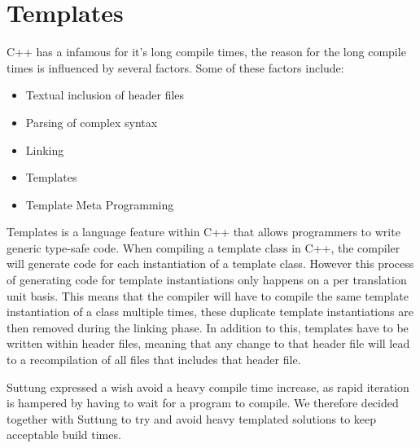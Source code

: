 \section{Templates}
\label{sec:requirements_templates}
C++ has a infamous for it's long compile times, the reason for the long compile times is influenced by several factors.
\cite{stack_overflow_why_does_cpp_compilation_take_so_long}
Some of these factors include:
\begin{itemize}
    \item
    Textual inclusion of header files

    \item
    Parsing of complex syntax

    \item
    Linking

    \item
    Templates

    \item
    Template Meta Programming
\end{itemize}

Templates is a language feature within C++ that allows programmers to write generic type-safe code.
When compiling a template class in C++, the compiler will generate code for each instantiation of
a template class.
However this process of generating code for template instantiations only happens on a per translation unit basis.
This means that the compiler will have to compile the same template instantiation of a class multiple times,
these duplicate template instantiations are then removed during the linking phase.
In addition to this, templates have to be written within header files,
meaning that any change to that header file will lead to a recompilation of all files that includes that header file.
\cite{dr_dobbs_cpp_compilation_speed}

Suttung expressed a wish avoid a heavy compile time increase, as rapid iteration is hampered by having to wait for a program to compile.
We therefore decided together with Suttung to try and avoid heavy templated solutions to keep acceptable build times.
